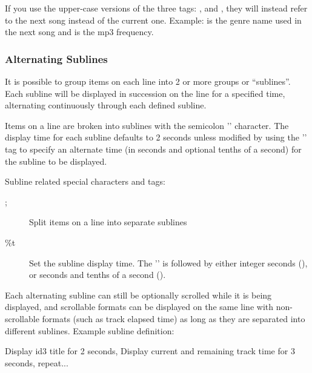 If you use the upper-case versions of the
three tags: ,  and , they will instead refer to 
the next song instead of the current one. Example:  is the genre 
name used in the next song and  is the mp3 frequency.\\


\subsubsection{\label{ref:AlternatingSublines}Alternating Sublines}

It is possible to group items on each line into 2 or more groups or 
``sublines''. Each subline will be displayed in succession on the line for a 
specified time, alternating continuously through each defined subline.

Items on a line are broken into sublines with the semicolon
'\config{;}' character. The display time for
each subline defaults to 2 seconds unless modified by using the
'' tag to specify an alternate
time (in seconds and optional tenths of a second) for the subline to be
displayed. 

Subline related special characters and tags: 
\begin{description}
\item[;] Split items on a line into separate sublines
\item[\%t] Set the subline display time. The
'' is followed by either integer
seconds (), or seconds and tenths of a second ().
\end{description}

Each alternating subline can still be optionally scrolled while it is
being displayed, and scrollable formats can be displayed on the same
line with non{}-scrollable formats (such as track elapsed time) as long
as they are separated into different sublines.
Example subline definition:
\begin{example}
                                 Display id3 title for 2 seconds,
                                 Display current and remaining track time
                                 for 3 seconds,
                                 repeat...
\end{example}

